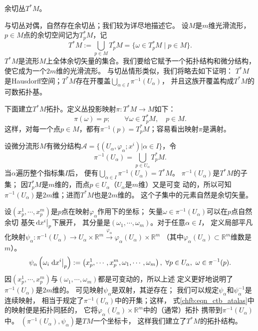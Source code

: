 \begin{example}\label{chfb:exm_ctb}
    余切丛$T^* M$。
\end{example}
与切丛对偶，自然存在余切丛；我们较为详尽地描述它。
设$M$是$m$维光滑流形，$p\in M$点的余切空间记为$T_p^* M$，记
\begin{equation}
    T^* M := \bigcup _{p\in M} T_p^* M = \{\omega \in T_p^* M \mid p\in M\} .
\end{equation}
$T^*M$是流形$M$上全体余切矢量的集合。我们要给它赋予一个拓扑结构和微分结构，使它成为一个$2m$维的光滑流形。
与切丛情形类似，我们将略去如下证明：
$T^*M$是Hausdorff空间；$T^*M$存在开覆盖$\bigcup _{\alpha\in I} \pi^{-1} (U_\alpha)$，
并且这族开覆盖构成$T^*M$的可数拓扑基。

下面建立$T^*M$拓扑。定义丛投影映射$\pi:T^*M\to M$如下：
\begin{equation*}
    \pi(\omega) = p; \qquad \forall \omega \in T_p^* M,\quad p\in M.
\end{equation*}
这样，对每一个点$p\in M$，都有$\pi^{-1}(p)=T_p^* M$；容易看出映射$\pi$是满射。

设微分流形$M$有微分结构$\mathscr{A}=\{(U_\alpha,\varphi_\alpha;x^i)|\alpha \in I \}$，令
\begin{equation*}
    \pi^{-1} (U_\alpha) = \bigcup _{p\in U_\alpha} T_p^*M .
\end{equation*}
当$\alpha$遍历整个指标集$I$后，
便有$\bigcup _{\alpha \in I}  \pi^{-1} (U_\alpha) = T^*M$。
$\pi^{-1} (U_\alpha)$是$T^*M$的子集；
因$T^*_pM$是$m$维的，而点$p\in U_\alpha$（$U_\alpha$是$m$维）又是可变
动的，所以可知$\pi^{-1} (U_\alpha)$是$2m$维；进而$T^*M$也是$2m$维的。
这个子集中的元素自然是余切矢量。

设$(x_p^1,\cdots,x_p^m)$是$p$点在映射$\varphi_\alpha$作用下的坐标；
矢量$\omega \in \pi^{-1} (U_\alpha)$可以在$p$点自然余切
基矢$\left.\dd x^i \right | _p$下展开，
其分量是$(\omega_1,\cdots,\omega_m)$。对于任意$\alpha \in I$，
定义局部平凡化映射$\psi_\alpha: \pi^{-1} (U_\alpha) \to U_\alpha \times \mathbb{R}^m
\overset{\varphi_\alpha}{\longrightarrow} \varphi_\alpha(U_\alpha) \times \mathbb{R}^m $
（其中$\varphi_\alpha(U_\alpha) \subset \mathbb{R}^m$维数是$m$）。
\begin{equation}\label{chfb:eqn_ctb_atalas}
    \psi_\alpha\left(\omega_i \left. \dd x^i \right| _p \right) :=
    \left(x_p^1,\cdots,x_p^m, \omega_1,\cdots,\omega_m\right),
    \ \forall p\in U_\alpha,\ \omega\in \pi^{-1} (p).
\end{equation}
因$(x_p^1,\cdots,x_p^m)$与$(\omega_1,\cdots,\omega_m)$都是可变动的，所以上述
定义更好地说明了$\pi^{-1} (U_\alpha)$是$2m$维的。
可见映射$\psi_\alpha$是双射，其逆存在；
我们可以规定$\psi_\alpha$和$\psi_\alpha^{-1}$是连续映射，
相当于规定了$\pi^{-1} (U_\alpha)$中的开集；这样，
式\eqref{chfb:eqn_ctb_atalas}中的映射便是拓扑同胚的，
它将$\varphi_\alpha(U_\alpha) \times \mathbb{R}^m $中的（通常）拓扑
携带到$\pi^{-1} (U_\alpha)$中。
$(\pi^{-1} (U_\alpha),\psi_\alpha)$是$TM$一个坐标卡，
这样我们建立了$T^*M$的拓扑结构。

